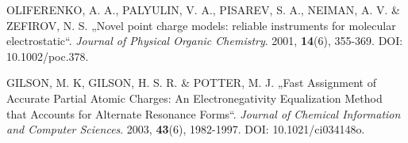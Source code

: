 \begin{thebibliography}{10}
OLIFERENKO, A. A., PALYULIN, V. A., PISAREV, S. A., NEIMAN, A. V. \& ZEFIROV, N. S. „Novel point charge models: reliable instruments for molecular electrostatic“. \textit{Journal of Physical Organic Chemistry}. 2001, \textbf{14}(6), 355-369. DOI: 10.1002/poc.378.

GILSON, M. K, GILSON, H. S. R. \& POTTER, M. J. „Fast Assignment of Accurate Partial Atomic Charges: An Electronegativity Equalization Method that Accounts for Alternate Resonance Forms“. \textit{Journal of Chemical Information and Computer Sciences}. 2003, \textbf{43}(6), 1982-1997. DOI: 10.1021/ci034148o.

\end{thebibliography}


\cleardoublepage
